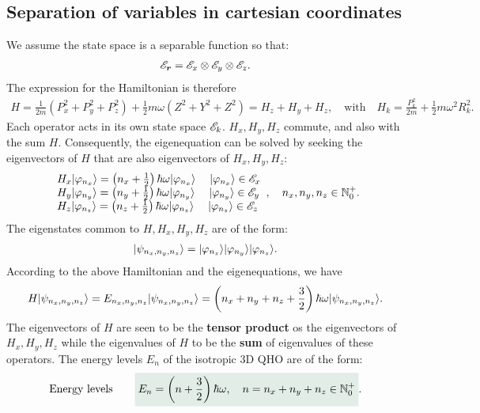 \subsection{Separation of variables in cartesian coordinates}
We assume the state space is a separable function so that:
\begin{align}
    \mathscr{E}_{\bm{r}}=\mathscr{E}_x\otimes\mathscr{E}_y\otimes\mathscr{E}_z.
\end{align}
The expression for the Hamiltonian is therefore
\begin{align}
    H=\frac{1}{2m}(P_x^2+P_y^2+P_z^2)+\frac{1}{2}m\omega(Z^2+Y^2+Z^2)=H_z+H_y+H_z,\quad\text{with}\quad H_k=\frac{P_k^2}{2m}+\frac{1}{2}m\omega^2R_k^2.
\end{align}
Each operator acts in its own state space $\mathscr{E}_k$. $H_x,H_y,H_z$ commute, and also with the sum $H$. Consequently, the eigenequation can be solved by 
seeking the eigenvectors of $H$ that are also eigenvectors of $H_x,H_y,H_z$:
\begin{align*}
    \begin{array}{l}H_x|\varphi_{n_x}\rangle=\left(n_x+\frac{1}{2}\right)\hbar\omega|\varphi_{n_x}\rangle\;\quad|\varphi_{n_x}\rangle\in\mathscr{E}_x\\
    H_y|\varphi_{n_y}\rangle=\left(n_y+\frac{1}{2}\right)\hbar\omega|\varphi_{n_y}\rangle\;\quad|\varphi_{n_y}\rangle\in\mathscr{E}_y\\
    H_z|\varphi_{n_z}\rangle=\left(n_z+\frac{1}{2}\right)\hbar\omega|\varphi_{n_z}\rangle\;\quad|\varphi_{n_z}\rangle\in\mathscr{E}_z\end{array},\quad n_x,n_y,n_z\in\mathbb{N}^+_0.
\end{align*}
The eigenstates common to $H,H_x,H_y,H_z$ are of the form:
\begin{align}
    |\psi_{n_x,n_y,n_z}\rangle=|\varphi_{n_z}\rangle|\varphi_{n_y}\rangle|\varphi_{n_z}\rangle.
\end{align}
According to the above Hamiltonian and the eigenequations, we have 
\begin{align}
    H|\psi_{n_x,n_y,n_z}\rangle=E_{n_x,n_y,n_z}|\psi_{n_x,n_y,n_z}\rangle=\left(n_x+n_y+n_z+\frac{3}{2}\right)\hbar\omega|\psi_{n_x,n_y,n_z}\rangle.
\end{align}
The eigenvectors of $H$ are seen to be the \textbf{tensor product} os the eigenvectors of $H_x,H_y,H_z$ while the eigenvalues of $H$ to be the \textbf{sum} of 
eigenvalues of these operators. The energy levels $E_n$ of the isotropic 3D QHO are of the form:
\begin{align}
    \text{Energy levels}\qquad\highlight{E_n=\left(n+\frac{3}{2}\right)\hbar\omega,\quad n=n_x+n_y+n_z\in\mathbb{N}_0^+}.
\end{align}
